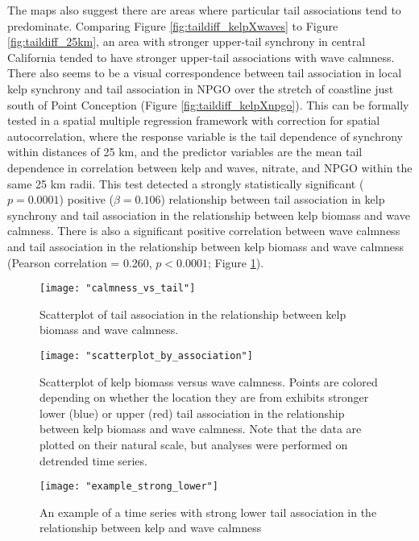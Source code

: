 \documentclass[12pt, oneside]{article}
\begin{document}
The maps also suggest there are areas where particular tail associations tend to predominate.
Comparing Figure \ref{fig:taildiff_kelpXwaves} to Figure \ref{fig:taildiff_25km}, an area with stronger upper-tail synchrony in central California tended to have stronger upper-tail associations with wave calmness.
There also seems to be a visual correspondence between tail association in local kelp synchrony and tail association in NPGO over the stretch of coastline just south of Point Conception (Figure \ref{fig:taildiff_kelpXnpgo}).
This can be formally tested in a spatial multiple regression framework with correction for spatial autocorrelation, where the response variable is the tail dependence of synchrony within distances of 25 km, and the predictor variables are the mean tail dependence in correlation between kelp and waves, nitrate, and NPGO within the same 25 km radii.
This test detected a strongly statistically significant ($p = 0.0001$) positive ($\beta = 0.106$) relationship between tail association in kelp synchrony and tail association in the relationship between kelp biomass and wave calmness.
There is also a significant positive correlation between wave calmness and tail association in the relationship between kelp biomass and wave calmness (Pearson correlation = 0.260, $p < 0.0001$; Figure \ref{fig:calm_v_tail}).
 
\begin{figure}
   \centering
   \texttt{[image: "calmness\_vs\_tail"]}
   \caption{Scatterplot of tail association in the relationship between kelp biomass and wave calmness.}
   \label{fig:calm_v_tail}
\end{figure}

\begin{figure}
   \centering
   \texttt{[image: "scatterplot\_by\_association"]}
   \caption{Scatterplot of kelp biomass versus wave calmness. Points are colored depending on whether the location they are from exhibits stronger lower (blue) or upper (red) tail association in the relationship between kelp biomass and wave calmness. Note that the data are plotted on their natural scale, but analyses were performed on detrended time series.}
   \label{fig:assocscatter}
\end{figure}

\begin{figure}
   \centering
   \texttt{[image: "example\_strong\_lower"]}
   \caption{An example of a time series with strong lower tail association in the relationship between kelp and wave calmness}
   \label{fig:lowexample}
\end{figure}
\end{document}

